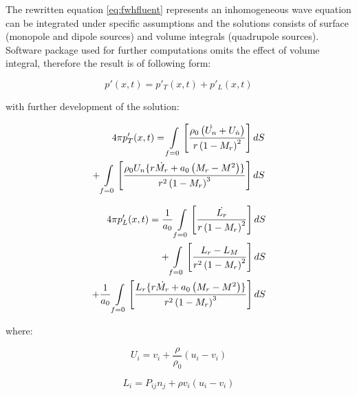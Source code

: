 The rewritten equation \ref{eq:fwhfluent} represents an inhomogeneous wave equation can be integrated under specific assumptions and the solutions consists of surface (monopole and dipole sources) and volume integrals (quadrupole sources). Software package used for further computations omits the effect of volume integral, therefore the result is of following form:

\begin{equation} \label{eq:fwhfluentsolved}
p'(x, t) = p'_T(x, t) + p'_L(x, t)
\end{equation}

\noindent with further development of the solution:

\begin{equation} \label{eq:fwhfluentpt}
\begin{split}
4 \pi p'_T (x, t)
= \int\displaylimits_{f=0} \left[ \frac{ \rho_0 \left( \dot{U_n} + U_{\dot{n}} \right)}{r \left( 1 - M_{r} \right)^{2}} \right] dS \\
+ \int\displaylimits_{f=0} \left[ \frac{\rho_0 U_n \lbrace r \dot{M_r} + a_0 \left( M_r - M^2 \right) \rbrace}{r^2 \left( 1 - M_{r} \right)^{3}} \right] dS
\end{split}
\end{equation}

\begin{equation} \label{eq:fwhfluentpl}
\begin{split}
4 \pi p'_L (x, t)
= \frac{1}{a_0} \int\displaylimits_{f=0} \left[ \frac{\dot{L_r}}{r \left(1 - M_r \right)^2 }\right] dS \\
+ \int\displaylimits_{f=0} \left[ \frac{L_r - L_M}{r^2 \left( 1 - M_r \right)^2 } \right] dS \\
+ \frac{1}{a_0} \int\displaylimits_{f=0} \left[ \frac{L_r \lbrace r \dot{M_r} + a_0 \left( M_r - M^2 \right) \rbrace }{r^2 \left( 1 - M_r \right)^3 } \right] dS
\end{split}
\end{equation}

\noindent where:

\begin{equation} \label{eq:fwhfluentui}
U_i = v_i + \frac{\rho}{\rho_0}\left(u_i - v_i \right)
\end{equation}

\begin{equation} \label{eq:fwhfluentli}
L_i = P_{ij} n_j + \rho v_i \left(u_i - v_i \right)
\end{equation}


